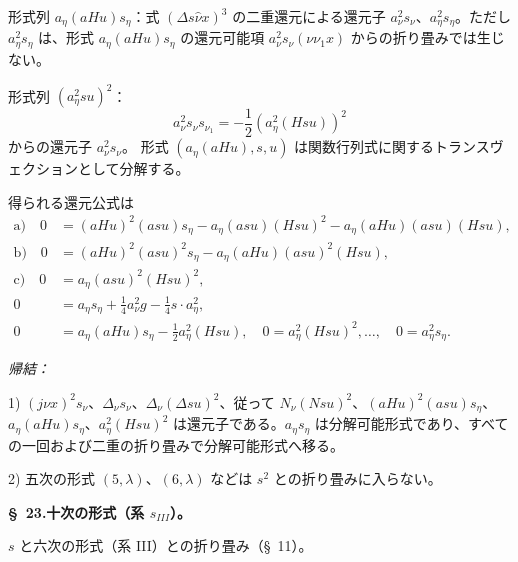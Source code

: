 \documentclass[11pt]{article}
\newcommand{\A}{\Delta}
\begin{document}
形式列 $a_\eta(aHu)s_\eta$：式 $(\A s\widehat\nu x)^3$ の二重還元による還元子 $a_\nu^2s_\nu$、$a_\eta^2s_\eta$。ただし $a_\eta^2s_\eta$ は、形式 $a_\eta(aHu)s_\eta$ の還元可能項 $a_\nu^2s_\nu(\nu\nu_1x)$ からの折り畳みでは生じない。

形式列 $(a_\eta^2su)^2$：
\[
a_\nu^2s_\nu s_{\nu_1}=-\frac12(a_\eta^2(Hsu))^2
\]
からの還元子 $a_\nu^2s_\nu$。
形式 $(a_\eta(aHu),s,u)$ は関数行列式に関するトランスヴェクションとして分解する。

得られる還元公式は
\[
\tag{30}
\begin{aligned}
\text{a)}\quad 0&=(aHu)^2(asu)s_\eta-a_\eta(asu)(Hsu)^2-a_\eta(aHu)(asu)(Hsu),\\
\text{b)}\quad 0&=(aHu)^2(asu)^2s_\eta-a_\eta(aHu)(asu)^2(Hsu),\\
\text{c)}\quad 0&=a_\eta(asu)^2(Hsu)^2,\\
0&=a_\eta s_\eta+\frac14a_\nu^2g-\frac14s\cdot a_\eta^2,\\
0&=a_\eta(aHu)s_\eta-\frac12a_\eta^2(Hsu),
\quad 0=a_\eta^2(Hsu)^2,\ldots,
\quad 0=a_\eta^2s_\eta.
\end{aligned}
\]

\noindent\emph{帰結：}

1) $(j\nu x)^2s_\nu$、$\A_\nu s_\nu$、$\A_\nu(\A su)^2$、従って $N_\nu(Nsu)^2$、$(aHu)^2(asu)s_\eta$、$a_\eta(aHu)s_\eta$、$a_\eta^2(Hsu)^2$ は還元子である。$a_\eta s_\eta$ は分解可能形式であり、すべての一回および二重の折り畳みで分解可能形式へ移る。

2) 五次の形式 $(5,\lambda)$、$(6,\lambda)$ などは $s^2$ との折り畳みに入らない。

\begin{center}\textbf{\S\ 23.\quad 十次の形式（系 $s_{III}$）。}\end{center}
$s$ と六次の形式（系 III）との折り畳み（\S\ 11）。
\end{document}

